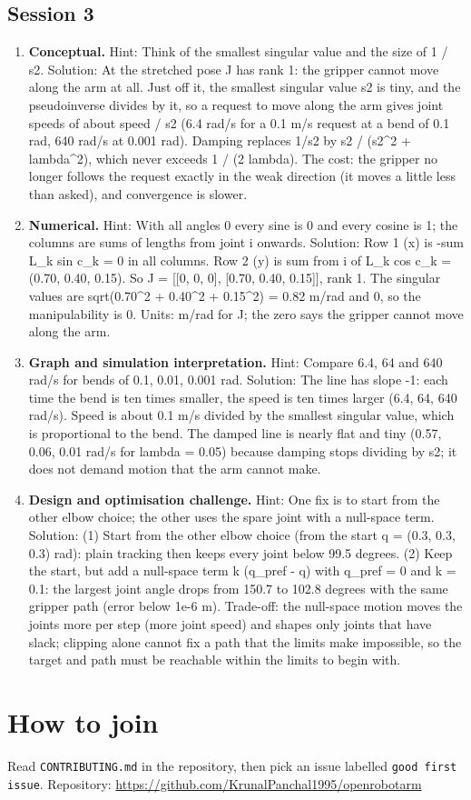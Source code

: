 \documentclass[11pt,a4paper]{article}
\begin{document}
\subsection*{Session 3}
\begin{enumerate}[nosep]
\item \textbf{Conceptual.} Hint: Think of the smallest singular value and the size of 1 / s2. Solution: At the stretched pose J has rank 1: the gripper cannot move along the arm at all. Just off it, the smallest singular value s2 is tiny, and the pseudoinverse divides by it, so a request to move along the arm gives joint speeds of about speed / s2 (6.4 rad/s for a 0.1 m/s request at a bend of 0.1 rad, 640 rad/s at 0.001 rad). Damping replaces 1/s2 by s2 / (s2\textasciicircum{}2 + lambda\textasciicircum{}2), which never exceeds 1 / (2 lambda). The cost: the gripper no longer follows the request exactly in the weak direction (it moves a little less than asked), and convergence is slower.
\item \textbf{Numerical.} Hint: With all angles 0 every sine is 0 and every cosine is 1; the columns are sums of lengths from joint i onwards. Solution: Row 1 (x) is -sum L\_k sin c\_k = 0 in all columns. Row 2 (y) is sum from i of L\_k cos c\_k = (0.70, 0.40, 0.15). So J = [[0, 0, 0], [0.70, 0.40, 0.15]], rank 1. The singular values are sqrt(0.70\textasciicircum{}2 + 0.40\textasciicircum{}2 + 0.15\textasciicircum{}2) = 0.82 m/rad and 0, so the manipulability is 0. Units: m/rad for J; the zero says the gripper cannot move along the arm.
\item \textbf{Graph and simulation interpretation.} Hint: Compare 6.4, 64 and 640 rad/s for bends of 0.1, 0.01, 0.001 rad. Solution: The line has slope -1: each time the bend is ten times smaller, the speed is ten times larger (6.4, 64, 640 rad/s). Speed is about 0.1 m/s divided by the smallest singular value, which is proportional to the bend. The damped line is nearly flat and tiny (0.57, 0.06, 0.01 rad/s for lambda = 0.05) because damping stops dividing by s2; it does not demand motion that the arm cannot make.
\item \textbf{Design and optimisation challenge.} Hint: One fix is to start from the other elbow choice; the other uses the spare joint with a null-space term. Solution: (1) Start from the other elbow choice (from the start q = (0.3, 0.3, 0.3) rad): plain tracking then keeps every joint below 99.5 degrees. (2) Keep the start, but add a null-space term k (q\_pref - q) with q\_pref = 0 and k = 0.1: the largest joint angle drops from 150.7 to 102.8 degrees with the same gripper path (error below 1e-6 m). Trade-off: the null-space motion moves the joints more per step (more joint speed) and shapes only joints that have slack; clipping alone cannot fix a path that the limits make impossible, so the target and path must be reachable within the limits to begin with.
\end{enumerate}

\section{How to join}
Read \texttt{CONTRIBUTING.md} in the repository, then pick an issue labelled \texttt{good first issue}. Repository: \url{https://github.com/KrunalPanchal1995/openrobotarm}
\end{document}
